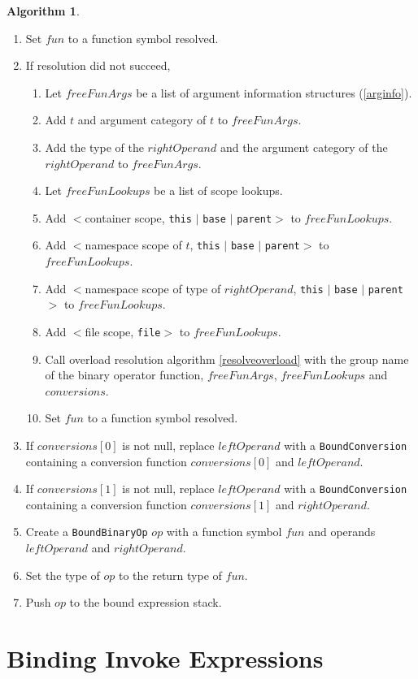 \documentclass[a4paper,oneside,11pt]{book}
\theoremstyle{definition}
\newtheorem{algo}{Algorithm}[section]
\begin{document}
\begin{algo}
\begin{enumerate}
\item
Set $fun$ to a function symbol resolved.
\item
If resolution did not succeed,
\begin{enumerate}
\item
Let $freeFunArgs$ be a list of argument information structures (\ref{arginfo}).
\item
Add $t$ and argument category of $t$ to $freeFunArgs$.
\item
Add the type of the $rightOperand$ and the argument category of the $rightOperand$ to $freeFunArgs$.
\item
Let $freeFunLookups$ be a list of scope lookups.
\item
Add $<$container scope, \verb|this| $|$ \verb|base| $|$ \verb|parent|$>$ to $freeFunLookups$.
\item
Add $<$namespace scope of $t$, \verb|this| $|$ \verb|base| $|$ \verb|parent|$>$ to $freeFunLookups$.
\item
Add $<$namespace scope of type of $rightOperand$, \verb|this| $|$ \verb|base| $|$ \verb|parent|$>$ to $freeFunLookups$.
\item
Add $<$file scope, \verb|file|$>$ to $freeFunLookups$.
\item
Call overload resolution algorithm \ref{resolveoverload} with the group name of the binary operator function, $freeFunArgs$, $freeFunLookups$ and $conversions$.
\item
Set $fun$ to a function symbol resolved.
\end{enumerate}
\item
If $conversions[0]$ is not null, replace $leftOperand$ with a \verb|BoundConversion| containing a conversion function $conversions[0]$ and $leftOperand$.
\item
If $conversions[1]$ is not null, replace $leftOperand$ with a \verb|BoundConversion| containing a conversion function $conversions[1]$ and $rightOperand$.
\item
Create a \verb|BoundBinaryOp| $op$ with a function symbol $fun$ and operands $leftOperand$ and $rightOperand$.
\item
Set the type of $op$ to the return type of $fun$.
\item
Push $op$ to the bound expression stack.
\end{enumerate}
\end{algo}

\section{Binding Invoke Expressions}
\end{document}

